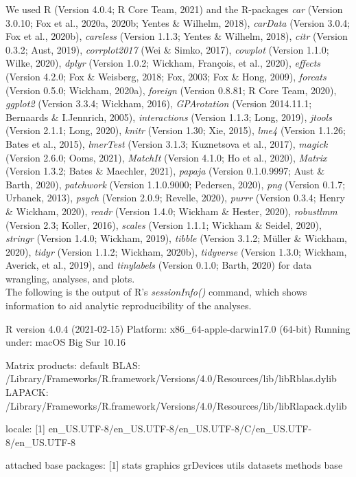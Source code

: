 \documentclass[
  english,
  man, noextraspace]{apa7}
\begin{document}
\begin{appendix}
We used R (Version 4.0.4; R Core Team, 2021) and the R-packages
\emph{car} (Version 3.0.10; Fox et al., 2020a, 2020b; Yentes \& Wilhelm,
2018), \emph{carData} (Version 3.0.4; Fox et al., 2020b),
\emph{careless} (Version 1.1.3; Yentes \& Wilhelm, 2018), \emph{citr}
(Version 0.3.2; Aust, 2019), \emph{corrplot2017} (Wei \& Simko, 2017),
\emph{cowplot} (Version 1.1.0; Wilke, 2020), \emph{dplyr} (Version
1.0.2; Wickham, François, et al., 2020), \emph{effects} (Version 4.2.0;
Fox \& Weisberg, 2018; Fox, 2003; Fox \& Hong, 2009), \emph{forcats}
(Version 0.5.0; Wickham, 2020a), \emph{foreign} (Version 0.8.81; R Core
Team, 2020), \emph{ggplot2} (Version 3.3.4; Wickham, 2016),
\emph{GPArotation} (Version 2014.11.1; Bernaards \& I.Jennrich, 2005),
\emph{interactions} (Version 1.1.3; Long, 2019), \emph{jtools} (Version
2.1.1; Long, 2020), \emph{knitr} (Version 1.30; Xie, 2015), \emph{lme4}
(Version 1.1.26; Bates et al., 2015), \emph{lmerTest} (Version 3.1.3;
Kuznetsova et al., 2017), \emph{magick} (Version 2.6.0; Ooms, 2021),
\emph{MatchIt} (Version 4.1.0; Ho et al., 2020), \emph{Matrix} (Version
1.3.2; Bates \& Maechler, 2021), \emph{papaja} (Version 0.1.0.9997; Aust
\& Barth, 2020), \emph{patchwork} (Version 1.1.0.9000; Pedersen, 2020),
\emph{png} (Version 0.1.7; Urbanek, 2013), \emph{psych} (Version 2.0.9;
Revelle, 2020), \emph{purrr} (Version 0.3.4; Henry \& Wickham, 2020),
\emph{readr} (Version 1.4.0; Wickham \& Hester, 2020), \emph{robustlmm}
(Version 2.3; Koller, 2016), \emph{scales} (Version 1.1.1; Wickham \&
Seidel, 2020), \emph{stringr} (Version 1.4.0; Wickham, 2019),
\emph{tibble} (Version 3.1.2; Müller \& Wickham, 2020), \emph{tidyr}
(Version 1.1.2; Wickham, 2020b), \emph{tidyverse} (Version 1.3.0;
Wickham, Averick, et al., 2019), and \emph{tinylabels} (Version 0.1.0;
Barth, 2020) for data wrangling, analyses, and plots.\\
The following is the output of R's \emph{sessionInfo()} command, which
shows information to aid analytic reproducibility of the analyses.

R version 4.0.4 (2021-02-15) Platform: x86\_64-apple-darwin17.0 (64-bit)
Running under: macOS Big Sur 10.16

Matrix products: default BLAS:
/Library/Frameworks/R.framework/Versions/4.0/Resources/lib/libRblas.dylib
LAPACK:
/Library/Frameworks/R.framework/Versions/4.0/Resources/lib/libRlapack.dylib

locale: {[}1{]}
en\_US.UTF-8/en\_US.UTF-8/en\_US.UTF-8/C/en\_US.UTF-8/en\_US.UTF-8

attached base packages: {[}1{]} stats graphics grDevices utils datasets
methods base


\end{appendix}
\end{document}
